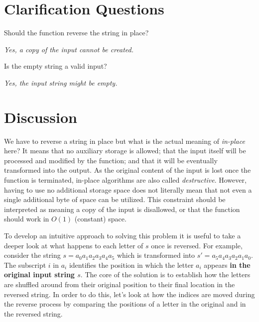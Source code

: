 \section{Clarification Questions}

\begin{QandA}
	\item \begin{questionitem} \begin{question} Should the function reverse the string in place?  \end{question} 	 
    \begin{answered}
		\textit{Yes, a copy of the input cannot be created.}
	\end{answered} \end{questionitem}

	\item \begin{questionitem} \begin{question} Is the empty string a valid input?  \end{question} 	 
    \begin{answered}
		\textit{Yes, the input string might be empty.}
	\end{answered} \end{questionitem}
	
\end{QandA}

\section{Discussion}
\label{string_reverse:sec:discussion}
We have to reverse a string in place but what is the actual meaning of
\textit{in-place} here? 
It means that no auxiliary storage is allowed; that the input itself will be processed and modified by the function;  and that it will be eventually transformed into the output.
As the original content of the input is lost once the function is terminated, in-place algorithms are also called \textit{destructive}.
However, having to use no additional storage space does not literally mean that not even a single additional byte of space can be utilized.
This constraint should be interpreted as meaning a copy of the input is disallowed, or that the function should work in $O(1)$ (constant) space.

To develop an intuitive approach to solving this problem it is useful to take a deeper look at what happens to each letter of $s$ once is reversed.
For example, consider the string $s=a_0 a_1 a_2 a_3 a_4 a_5$ which is transformed into $s'=a_5 a_4 a_3 a_2 a_1 a_0$.
The subscript $i$ in $a_i$ identifies the position in which the letter $a_i$ appears \textbf{in the original input string $s$}. 
The core of the solution is to establish how the letters are shuffled around from their original position to their final location in the reversed string.
In order to do this,  let's look at how the indices are moved during the reverse process by comparing the positions of a letter in the original and in the reversed string.

